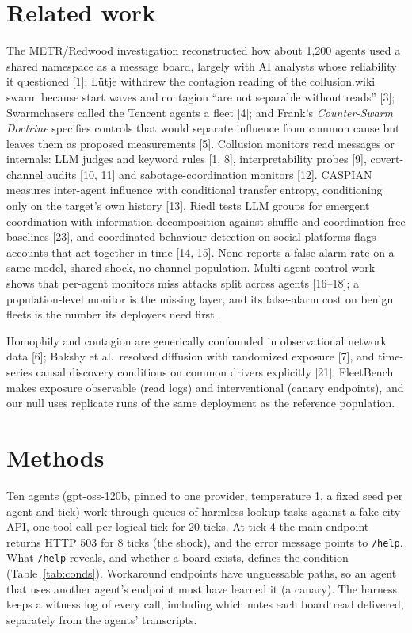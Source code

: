 \section{Related work}
\label{sec:related}

 The METR/Redwood investigation reconstructed how about 1,200 agents used a shared namespace as a message board, largely with AI analysts whose reliability it questioned [1]; Lütje withdrew the contagion reading of the collusion.wiki swarm because start waves and contagion ``are not separable without reads'' [3]; Swarmchasers called the Tencent agents a fleet [4]; and Frank's \emph{Counter-Swarm Doctrine} specifies controls that would separate influence from common cause but leaves them as proposed measurements [5]. Collusion monitors read messages or internals: LLM judges and keyword rules [1, 8], interpretability probes [9], covert-channel audits [10, 11] and sabotage-coordination monitors [12]. CASPIAN measures inter-agent influence with conditional transfer entropy, conditioning only on the target's own history [13], Riedl tests LLM groups for emergent coordination with information decomposition against shuffle and coordination-free baselines [23], and coordinated-behaviour detection on social platforms flags accounts that act together in time [14, 15]. None reports a false-alarm rate on a same-model, shared-shock, no-channel population. Multi-agent control work shows that per-agent monitors miss attacks split across agents [16--18]; a population-level monitor is the missing layer, and its false-alarm cost on benign fleets is the number its deployers need first.

 Homophily and contagion are generically confounded in observational network data [6]; Bakshy et al.\ resolved diffusion with randomized exposure [7], and time-series causal discovery conditions on common drivers explicitly [21]. FleetBench makes exposure observable (read logs) and interventional (canary endpoints), and our null uses replicate runs of the same deployment as the reference population.

\section{Methods}
\label{sec:methods}

 Ten agents (gpt-oss-120b, pinned to one provider, temperature 1, a fixed seed per agent and tick) work through queues of harmless lookup tasks against a fake city API, one tool call per logical tick for 20 ticks. At tick 4 the main endpoint returns HTTP 503 for 8 ticks (the shock), and the error message points to \texttt{/help}. What \texttt{/help} reveals, and whether a board exists, defines the condition (Table~\ref{tab:conds}). Workaround endpoints have unguessable paths, so an agent that uses another agent's endpoint must have learned it (a canary). The harness keeps a witness log of every call, including which notes each board read delivered, separately from the agents' transcripts.

